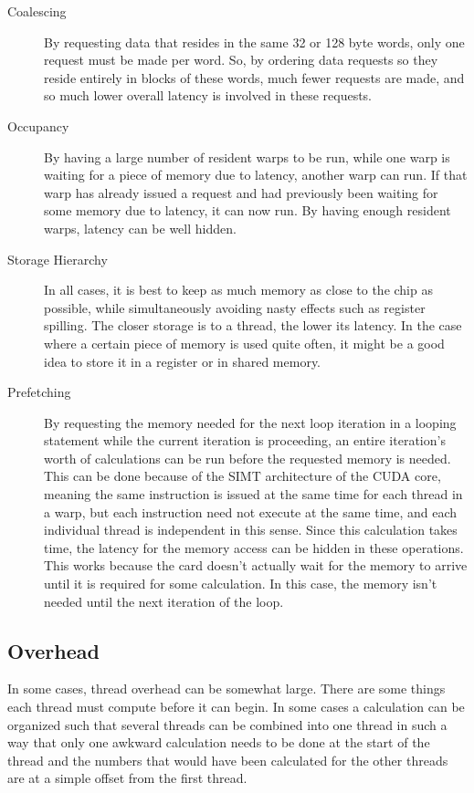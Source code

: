 \documentclass[a4paper,12pt]{report}
\begin{document}
\begin{description}
\item[Coalescing] By requesting data that resides in the same 32 or 128 byte words, only one request must be made per word.
So, by ordering data requests so they reside entirely in blocks of these words, much fewer requests are made, and so much lower overall latency is involved in these requests.

\item[Occupancy] By having a large number of resident warps to be run, while one warp is waiting for a piece of memory due to latency, another warp can run\cite[p~39]{ CUDA_C_Best_Practices_Guide}.
If that warp has already issued a request and had previously been waiting for some memory due to latency, it can now run.
By having enough resident warps, latency can be well hidden.

\item[Storage Hierarchy] In all cases, it is best to keep as much memory as close to the chip as possible, while simultaneously avoiding nasty effects such as register spilling.
The closer storage is to a thread, the lower its latency.
In the case where a certain piece of memory is used quite often, it might be a good idea to store it in a register or in shared memory.

\item[Prefetching] By requesting the memory needed for the next loop iteration in a looping statement while the current iteration is proceeding, an entire iteration's worth of calculations can be run before the requested memory is needed\cite[p~113]{ KirkAndHwu}.
This can be done because of the SIMT architecture of the CUDA core, meaning the same instruction is issued at the same time for each thread in a warp, but each instruction need not execute at the same time, and each individual thread is independent in this sense.
Since this calculation takes time, the latency for the memory access can be hidden in these operations.
This works because the card doesn't actually wait for the memory to arrive until it is required for some calculation.
In this case, the memory isn't needed until the next iteration of the loop.

\end{description}




\subsection{Overhead}
In some cases, thread overhead can be somewhat large.
There are some things each thread must compute before it can begin.
In some cases a calculation can be organized such that several threads can be combined into one thread in such a way that only one awkward calculation needs to be done at the start of the thread and the numbers that would have been calculated for the other threads are at a simple offset from the first thread.
\end{document}
